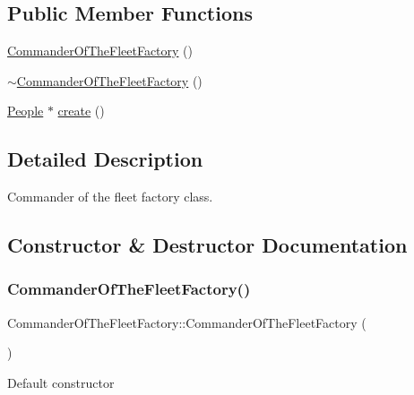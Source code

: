 \subsection*{Public Member Functions}
\begin{DoxyCompactItemize}
\item 
\hyperlink{classCommanderOfTheFleetFactory_a8a5df50232cc48a885ba2a05928a8301}{Commander\+Of\+The\+Fleet\+Factory} ()
\item 
\hyperlink{classCommanderOfTheFleetFactory_ad6a8e81a67057ce5d65c47289cd7b4f4}{$\sim$\+Commander\+Of\+The\+Fleet\+Factory} ()
\item 
\hyperlink{classPeople}{People} $\ast$ \hyperlink{classCommanderOfTheFleetFactory_aabbbbcb6c52f23e008b186e59aa5c84b}{create} ()
\end{DoxyCompactItemize}


\subsection{Detailed Description}
Commander of the fleet factory class. 

\subsection{Constructor \& Destructor Documentation}
\mbox{\label{classCommanderOfTheFleetFactory_a8a5df50232cc48a885ba2a05928a8301}} 
\subsubsection{\texorpdfstring{Commander\+Of\+The\+Fleet\+Factory()}{CommanderOfTheFleetFactory()}}
{\footnotesize\ttfamily Commander\+Of\+The\+Fleet\+Factory\+::\+Commander\+Of\+The\+Fleet\+Factory (\begin{DoxyParamCaption}{ }\end{DoxyParamCaption})\hspace{0.3cm}{\ttfamily [inline]}}

Default constructor \mbox{\label{classCommanderOfTheFleetFactory_ad6a8e81a67057ce5d65c47289cd7b4f4}} 
